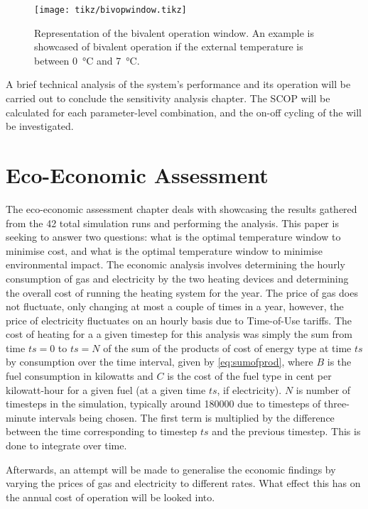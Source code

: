 \begin{figure}[htb]
    \centering
    \texttt{[image: tikz/bivopwindow.tikz]}
    \caption{Representation of the bivalent operation window. An example is showcased of bivalent operation if the external temperature is between \qty{0}{\celsius} and \qty{7}{\celsius}.}
    \label{fig:bivopwindow}
\end{figure}

A brief technical analysis of the system's performance and its operation will be carried out to conclude the sensitivity analysis chapter. The \ac{SCOP} will be calculated for each parameter-level combination, and the on-off cycling of the \HP will be investigated.

\section{Eco-Economic Assessment}\label{sec:methodecoeco}
The eco-economic assessment chapter deals with showcasing the results gathered from the 42 total simulation runs and performing the analysis. This paper is seeking to answer two questions: what is the optimal temperature window to minimise cost, and what is the optimal temperature window to minimise environmental impact. The economic analysis involves determining the hourly consumption of gas and electricity by the two heating devices and determining the overall cost of running the heating system for the year. The price of gas does not fluctuate, only changing at most a couple of times in a year, however, the price of electricity fluctuates on an hourly basis due to Time-of-Use tariffs. The cost of heating for a a given timestep for this analysis was simply the sum from time $\mathit{ts}=0$ to $\mathit{ts}=N$ of the sum of the products of cost of energy type at time $\mathit{ts}$ by consumption over the time interval, given by \cref{eq:sumofprod}, where $B$ is the fuel consumption in kilowatts and $C$ is the cost of the fuel type in cent per kilowatt-hour for a given fuel (at a given time $\mathit{ts}$, if electricity). $N$ is number of timesteps in the simulation, typically around \num{180000} due to timesteps of three-minute intervals being chosen. The first term is multiplied by the difference between the time corresponding to timestep $\mathit{ts}$ and the previous timestep. This is done to integrate over time. 

Afterwards, an attempt will be made to generalise the economic findings by varying the prices of gas and electricity to different rates. What effect this has on the annual cost of operation will be looked into.

